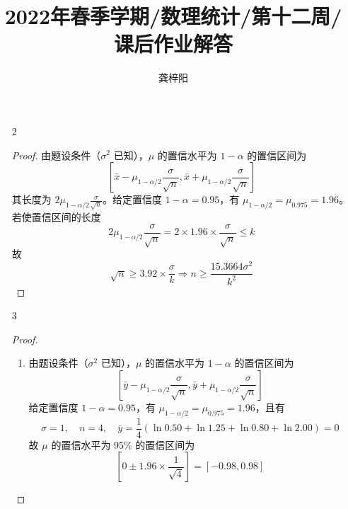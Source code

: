 \documentclass[normal,cn]{elegantnote}
\title{2022年春季学期/数理统计/第十二周/课后作业解答}
\author{龚梓阳}
\date{\zhtoday}
\begin{document}
\maketitle
\begin{enumerate}
    \item[2]
        \begin{proof}
            由题设条件（$\sigma^{2}$ 已知），$\mu$ 的置信水平为 $1-\alpha$ 的置信区间为
            \begin{equation*}
                \left[\bar{x}-\mu_{1-\alpha/2} \frac{\sigma}{\sqrt{n}},\bar{x}+\mu_{1-\alpha/2} \frac{\sigma}{\sqrt{n}}\right]
            \end{equation*}
            其长度为 $2\mu_{1-\alpha/2}\frac{\sigma}{\sqrt{n}}$。给定置信度 $1-\alpha=0.95$，有 $\mu_{1-\alpha/2}=\mu_{0.975}=1.96$。若使置信区间的长度
            \begin{equation*}
                2\mu_{1-\alpha/2}\frac{\sigma}{\sqrt{n}}=2\times 1.96 \times\frac{\sigma}{\sqrt{n}}\leq k
            \end{equation*}
            故
            \begin{equation*}
                \sqrt{n}\geq 3.92\times\frac{\sigma}{k} \Rightarrow n\geq\frac{15.3664\sigma^{2}}{k^{2}}
            \end{equation*}
        \end{proof}
    \item[3]
        \begin{proof}
            \begin{enumerate}
                \item 由题设条件（$\sigma^{2}$ 已知），$\mu$ 的置信水平为 $1-\alpha$ 的置信区间为
                      \begin{equation*}
                          \left[\bar{y}-\mu_{1-\alpha/2}\frac{\sigma}{\sqrt{n}},\bar{y}+\mu_{1-\alpha/2}\frac{\sigma}{\sqrt{n}}\right]
                      \end{equation*}
                      给定置信度 $1-\alpha=0.95$，有 $\mu_{1-\alpha/2}=\mu_{0.975}=1.96$，且有
                      \begin{equation*}
                          \sigma=1,\quad n=4,\quad \bar{y}=\frac{1}{4}(\ln 0.50+\ln 1.25+\ln 0.80+\ln 2.00)=0
                      \end{equation*}
                      故 $\mu$ 的置信水平为 95\% 的置信区间为
                      \begin{equation*}
                          \left[0 \pm 1.96 \times\frac{1}{\sqrt{4}}\right]=\left[-0.98,0.98\right]

\end{equation*}
\end{enumerate}
\end{proof}
\end{enumerate}
\end{document}
